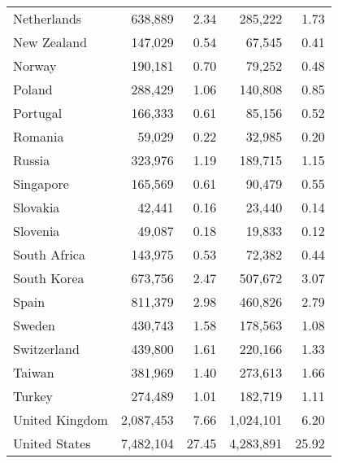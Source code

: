 \begin{tabular}{lrrrr}
Netherlands    &   638,889 &         2.34 &   285,222 &         1.73 \\
New Zealand    &   147,029 &         0.54 &    67,545 &         0.41 \\
Norway         &   190,181 &         0.70 &    79,252 &         0.48 \\
Poland         &   288,429 &         1.06 &   140,808 &         0.85 \\
Portugal       &   166,333 &         0.61 &    85,156 &         0.52 \\
Romania        &    59,029 &         0.22 &    32,985 &         0.20 \\
Russia         &   323,976 &         1.19 &   189,715 &         1.15 \\
Singapore      &   165,569 &         0.61 &    90,479 &         0.55 \\
Slovakia       &    42,441 &         0.16 &    23,440 &         0.14 \\
Slovenia       &    49,087 &         0.18 &    19,833 &         0.12 \\
South Africa   &   143,975 &         0.53 &    72,382 &         0.44 \\
South Korea    &   673,756 &         2.47 &   507,672 &         3.07 \\
Spain          &   811,379 &         2.98 &   460,826 &         2.79 \\
Sweden         &   430,743 &         1.58 &   178,563 &         1.08 \\
Switzerland    &   439,800 &         1.61 &   220,166 &         1.33 \\
Taiwan         &   381,969 &         1.40 &   273,613 &         1.66 \\
Turkey         &   274,489 &         1.01 &   182,719 &         1.11 \\
United Kingdom & 2,087,453 &         7.66 & 1,024,101 &         6.20 \\
United States  & 7,482,104 &        27.45 & 4,283,891 &        25.92 \\
\bottomrule
\end{tabular}
